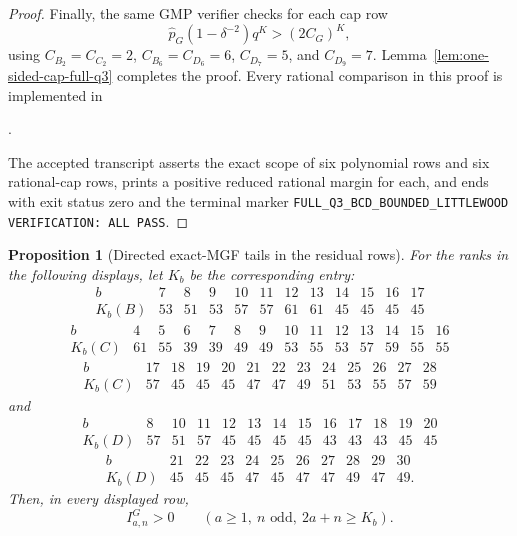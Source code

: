 \documentclass[11pt,reqno]{amsart}
\theoremstyle{plain}
\newtheorem{proposition}[theorem]{Proposition}
\theoremstyle{definition}
\begin{document}
\begin{proof}
Finally, the same GMP verifier checks for each cap row
\[
 \widehat p_G(1-\delta^{-2})q^K>(2C_G)^K,
\]
using $C_{B_2}=C_{C_2}=2$, $C_{B_6}=C_{D_6}=6$, $C_{D_7}=5$, and
$C_{D_9}=7$.  Lemma~\ref{lem:one-sided-cap-full-q3} completes the proof.
Every rational comparison in this proof is implemented in
\begin{center}
.
\end{center}
The accepted transcript
 asserts the exact
scope of six polynomial rows and six rational-cap rows, prints a positive
reduced rational margin for each, and ends with exit status zero and the
terminal marker
\texttt{FULL\_Q3\_BCD\_BOUNDED\_LITTLEWOOD VERIFICATION: ALL PASS}.
\end{proof}

\begin{proposition}[Directed exact-MGF tails in the residual rows]
\label{prop:bcd-remaining-directed-tails}
For the ranks in the following displays, let $K_b$ be the corresponding
entry:
\[
\begin{array}{c|rrrrrrrrrrr}
b&7&8&9&10&11&12&13&14&15&16&17\\ \hline
K_b(B)&53&51&53&57&57&61&61&45&45&45&45
\end{array}
\]
\[
\begin{array}{c|rrrrrrrrrrrrr}
b&4&5&6&7&8&9&10&11&12&13&14&15&16\\ \hline
K_b(C)&61&55&39&39&49&49&53&55&53&57&59&55&55
\end{array}
\]
\[
\begin{array}{c|rrrrrrrrrrrr}
b&17&18&19&20&21&22&23&24&25&26&27&28\\ \hline
K_b(C)&57&45&45&45&47&47&49&51&53&55&57&59
\end{array}
\]
and
\[
\begin{array}{c|rrrrrrrrrrrr}
b&8&10&11&12&13&14&15&16&17&18&19&20\\ \hline
K_b(D)&57&51&57&45&45&45&45&43&43&43&45&45
\end{array}
\]
\[
\begin{array}{c|rrrrrrrrrr}
b&21&22&23&24&25&26&27&28&29&30\\ \hline
K_b(D)&45&45&45&47&45&47&47&49&47&49.
\end{array}
\]
Then, in every displayed row,
\[
 I^G_{a,n}>0
 \qquad(a\geq1,\ n\text{ odd},\ 2a+n\geq K_b).
\]
\end{proposition}
\end{document}
